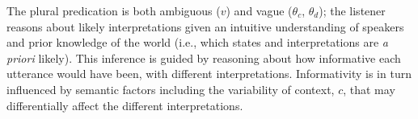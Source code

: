 \documentclass[preprint,12pt,authoryear,titlepage]{elsarticle}
\begin{document}
The plural predication is both ambiguous ($v$) and vague ($\theta_{c}$, $\theta_d$); the listener reasons about likely interpretations given an intuitive understanding of speakers and prior knowledge of the world (i.e., which states and interpretations are \emph{a priori} likely). This inference is guided by reasoning about how informative each utterance would have been, with different interpretations. Informativity is in turn influenced by semantic factors including the variability of context, $c$, that may differentially affect the different interpretations.


%
%
%
%
%
%
\end{document}
